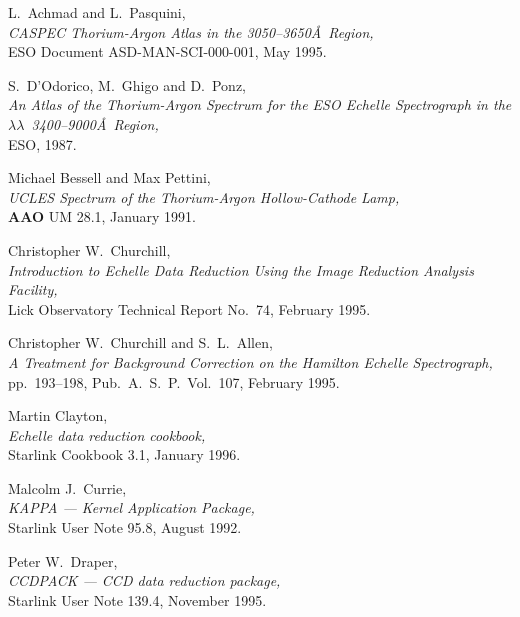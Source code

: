 \documentclass[twoside,11pt]{article}
\newcommand{\stardocinitials}  {SG}
\newcommand{\stardocnumber}    {9.2}
\newcommand{\stardocname}{\stardocinitials /\stardocnumber}
\newcommand{\htmlref}[2]{#1}
\newcommand{\xref}[3]{#1}
\newcommand{\xlabel}[1]{}
\newcommand{\sgspec}[2]{#1}
\newcommand{\sgspec}[2]{#2}
\begin{document}
\newpage
\markboth{References}{\stardocname}
\label{se_references}\xlabel{references}
\begin{thebibliography}{999}

 L.~Achmad and L.~Pasquini,\\
      {\sl CASPEC Thorium-Argon Atlas in the 3050\sgspec{--}{-}3650\AA\
      Region,}\\
      ESO Document ASD-MAN-SCI-000-001, May 1995.

 S.~D'Odorico, M.~Ghigo and D.~Ponz,\\
      {\sl An Atlas of the Thorium-Argon Spectrum for the ESO Echelle
      Spectrograph in the $\lambda\lambda$~3400\sgspec{--}{-}9000\AA\ Region,}\\
      ESO, 1987.

 Michael Bessell and Max Pettini,\\
      {\sl UCLES Spectrum of the Thorium-Argon Hollow-Cathode Lamp,}\\
      \htmlref{{\bf AAO}}{gl_aao_aat} UM 28.1, January 1991.

 Christopher W.~Churchill,\\
      {\sl Introduction to Echelle Data Reduction Using the Image
      Reduction Analysis Facility,}\\
      Lick Observatory Technical Report No.~74, February 1995.

 Christopher W.~Churchill and S.~L.~Allen,\\
      {\sl A Treatment for Background Correction on the Hamilton Echelle
      Spectrograph,}\\
      pp.~193\sgspec{--}{-}198, Pub.~A.~S.~P.~Vol.~107, February 1995.

 Martin Clayton,\\
      {\sl \xref{Echelle data reduction cookbook}{sc3}{},}\\
      Starlink Cookbook 3.1, January 1996.

 Malcolm J.~Currie,\\
      {\sl \xref{KAPPA \sgspec{---}{-} Kernel Application Package}{sun95}{},}\\
      Starlink User Note 95.8, August 1992.

 Peter W.~Draper,\\
      {\sl \xref{CCDPACK \sgspec{---}{-} CCD data reduction package}
      {sun139}{},}\\
      Starlink User Note 139.4, November 1995.


\end{thebibliography}
\end{document}

